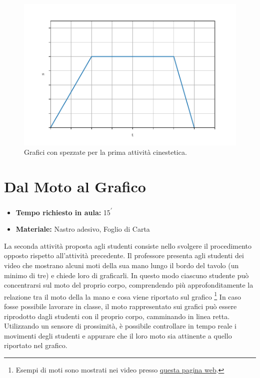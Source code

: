\documentclass{report} \usepackage[T1]{fontenc} \usepackage[italian]{babel}
\begin{document}
\begin{figure}[H]
\centering
  \includegraphics[width=\textwidth]{kine_plot3}
  \caption{Grafici con spezzate per la prima attività
           cinestetica.}
  \label{fig:kine_plot3}
\end{figure}


\section{Dal Moto al Grafico}

\begin{itemize}
\item \textbf{Tempo richiesto in aula:} 15\textsuperscript{$\prime$}
\item \textbf{Materiale:} Nastro adesivo, Foglio di Carta
\end{itemize}

La seconda attività proposta agli studenti consiste nello svolgere il
procedimento opposto rispetto all’attività precedente. Il professore presenta
agli studenti dei video che mostrano  alcuni moti della sua mano lungo il bordo
del tavolo (un minimo di tre) e chiede loro di graficarli. In questo modo
ciascuno studente può concentrarsi sul moto del proprio corpo, comprendendo più
approfonditamente la relazione tra il moto della la mano e cosa viene riportato
sul grafico
\footnote{
          Esempi di moti sono mostrati nei video presso
          \textcolor{blue}{\href{https://github.com/savaroskij/PED1/tree/master/progetto_finale/media/video/kine_videos_2}{questa pagina web}}.
}
In caso fosse possibile lavorare in classe, il moto rappresentato sui grafici
può essere riprodotto dagli studenti con il proprio corpo, camminando in linea
retta. Utilizzando un sensore di prossimità, è possibile controllare in
tempo reale i movimenti degli studenti e appurare che il loro moto sia
attinente a quello riportato nel grafico.
\end{document}
